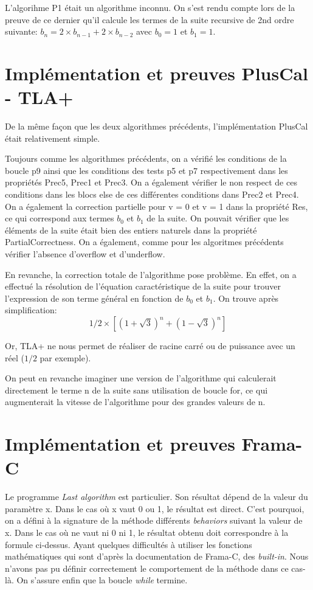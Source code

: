 \documentclass[a4paper,11pt, oneside]{book}
\begin{document}
		L'algorihme P1 était un algorithme inconnu. On s'est rendu compte lors de la
		preuve de ce dernier qu'il calcule les termes de la suite recursive de 2nd
		ordre suivante: $b_n = 2 \times b_{n-1} + 2 \times b_{n-2}$ avec $b_0 = 1$ et $b_1 = 1$.

		\section{Implémentation et preuves PlusCal - TLA+}

		De la même façon que les deux algorithmes précédents, l'implémentation PlusCal
		était relativement simple.

		Toujours comme les algorithmes précédents, on a vérifié les conditions de la boucle
		p9 ainsi que les conditions des tests p5 et p7 respectivement dans les propriétés
		Prec5, Prec1 et Prec3. On a également vérifier le non respect de ces conditions
		dans les blocs else de ces différentes conditions dans Prec2 et Prec4. On a
		également la correction partielle pour v = 0 et v = 1 dans la propriété Res,
		ce qui correspond aux termes $b_0$ et $b_1$ de la suite. On pouvait vérifier
		que les éléments de la suite était bien des entiers naturels dans la propriété
		PartialCorrectness. On a également, comme pour les algoritmes précédents vérifier
		l'absence d'overflow et d'underflow.

		En revanche, la correction totale de l'algorithme pose problème. En effet,
		on a effectué la résolution de l'équation caractéristique de la suite pour trouver
		l'expression de son terme général en fonction de $b_0$ et $b_1$.
		On trouve après simplification:
		$$1/2 \times [(1 + \sqrt 3)^n + (1 - \sqrt 3)^n]$$

		Or, TLA+ ne nous permet de réaliser de racine carré ou de puissance avec
		un réel ($1/2$ par exemple).

		On peut en revanche imaginer une version de l'algorithme qui calculerait
		directement le terme n de la suite sans utilisation de boucle for, ce qui
		augmenterait la vitesse de l'algorithme pour des grandes valeurs de n.


		\section{Implémentation et preuves Frama-C}

		Le programme \textit{Last algorithm} est particulier. Son résultat dépend de la valeur du paramètre x.
		Dans le cas où x vaut 0 ou 1, le résultat est direct. C'est pourquoi, on a défini à la signature
		de la méthode différents \textit{behaviors} suivant la valeur de x. Dans le cas où ne vaut
		ni 0 ni 1, le résultat obtenu doit correspondre à la formule ci-dessus. Ayant quelques
		difficultés à utiliser les fonctions mathématiques qui sont d'après la documentation de Frama-C,
		des \textit{built-in}. Nous n'avons pas pu définir correctement le comportement de la méthode dans ce cas-là.
		On s'assure enfin que la boucle \textit{while} termine.
\end{document}
